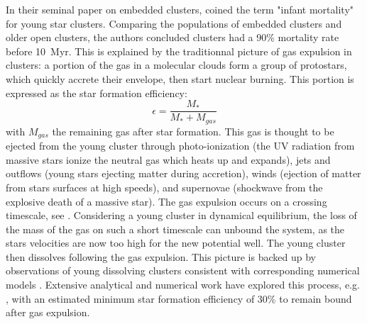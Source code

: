 In their seminal paper on embedded clusters, \cite{Lada2003} coined the term "infant mortality" for young star clusters. Comparing the populations of embedded clusters and older open clusters, the authors concluded clusters had a 90\% mortality rate before 10~Myr. This is explained by the traditionnal picture of gas expulsion in clusters: a portion of the gas in a molecular clouds form a group of protostars, which quickly accrete their envelope, then start nuclear burning. This portion is expressed as the star formation efficiency:
\begin{equation}
\epsilon = \frac{M_*}{M_* + M_{gas}}
\end{equation} 
with $M_{gas}$ the remaining gas after star formation. This gas is thought to be ejected from the young cluster through photo-ionization (the UV radiation from massive stars ionize the neutral gas which heats up and expands), jets and outflows (young stars ejecting matter during accretion), winds (ejection of matter from stars surfaces at high speeds), and supernovae (shockwave from the explosive death of a massive star). The gas expulsion occurs on a crossing timescale, see \cite{Krause2016}. Considering a young cluster in dynamical equilibrium, the loss of the mass of the gas on such a short timescale can unbound the system, as the stars velocities are now too high for the new potential well. The young cluster then dissolves following the gas expulsion.
This picture is backed up by observations of young dissolving clusters \citep{Bastian2006} consistent with corresponding numerical models \citep{Goodwin2006}. Extensive analytical and numerical work have explored this process, e.g. \cite{Tutukov1978,Hills1980,Lada1984,Adams2000,Boily2003a,Boily2003b}, with an estimated minimum star formation efficiency of 30\% to remain bound after gas expulsion.
%
%
